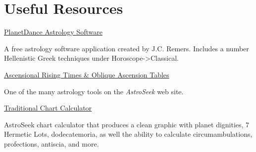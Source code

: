 \section{Useful Resources}

\noindent\href{https://www.jcremers.com/}{PlanetDance Astrology Software}

	A free astrology software application created by J.C. Remers. Includes a number Hellenistic Greek techniques under Horoscope->Classical.
	
	\noindent\href{https://horoscopes.astro-seek.com/calculate-ascensional-rising-times/?latitude=&narozeni_lat_custom_stupne=0&narozeni_lat_custom_minuty=0&narozeni_lat_custom_smer=0&narozeni_rok=2022&aya=&oa=&decimal=0}{Ascensional Rising Times \& Oblique Ascension Tables}
	
	One of the many astrology tools on the \textsl{AstroSeek} web site.
	
	\noindent\href{https://horoscopes.astro-seek.com/traditional-astrology}{Traditional Chart Calculator}
	
	AstroSeek chart calculator that produces a clean graphic with planet dignities, 7 Hermetic Lots, dodecatemoria, as well the ability to calculate circumambulations, profections, antiscia, and more.
	
\newpage
